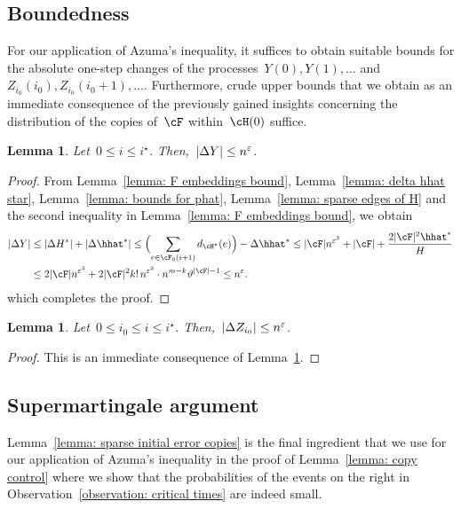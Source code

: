 \documentclass[11pt]{amsart}
\newcommand{\eps}{\varepsilon}
\DeclarePairedDelimiter{\paren}{\lparen}{\rparen}
\DeclarePairedDelimiter{\abs}{\lvert}{\rvert}
\renewcommand{\theta}{\vartheta}
\newtheorem{lemma}[algocf]{Lemma}
\theoremstyle{definition}
\numberwithin{equation}{section}
\begin{document}
	\subsection{Boundedness}\label{subsection: boundedness}
	For our application of Azuma's inequality, it suffices to obtain suitable bounds for the absolute one-step changes of the processes~$Y(0), Y(1),\ldots $ and~$Z_{i_0}(i_0),Z_{i_0}(i_0+1),\ldots$.
	Furthermore, crude upper bounds that we obtain as an immediate consequence of the previously gained insights concerning the distribution of the copies of~$\cF$ within~$\cH(0)$ suffice.
	
	\begin{lemma}\label{lemma: sparse absolute change copies not stopped}
		Let~$0 \leq i\leq i^\star$.
		Then,~$\abs{\Delta Y}\leq n^{\eps}$.
	\end{lemma}
	\begin{proof}
		From Lemma~\ref{lemma: F embeddings bound}, Lemma~\ref{lemma: delta hhat star}, Lemma~\ref{lemma: bounds for phat}, Lemma~\ref{lemma: sparse edges of H} and the second inequality in Lemma~\ref{lemma: F embeddings bound}, we obtain
		\begin{equation*}
			\begin{aligned}
				\abs{\Delta Y}
				&\leq \abs{\Delta H^*}+\abs{\Delta \hhat^*}
				\leq \paren[\Big]{\sum_{e\in \cF_0(i+1)}d_{\cH^*}(e)}-\Delta\hhat^*
				\leq \abs{\cF}n^{\eps^3}+\abs{\cF}+\frac{2\abs{\cF}^2\hhat^*}{H}\\
				&\leq 2\abs{\cF}n^{\eps^3}+2\abs{\cF}^2k!\,n^{\eps^2}\cdot n^{m-k}\theta^{\abs{\cF}-1}
				\leq n^\eps.
			\end{aligned}
		\end{equation*}
		which completes the proof.
	\end{proof}
	
	\begin{lemma}\label{lemma: sparse absolute change copies}
		Let~$0 \leq i_0\leq i\leq i^\star$.
		Then,~$\abs{\Delta Z_{i_0}}\leq n^{\eps}$.
	\end{lemma}
	\begin{proof}
		This is an immediate consequence of Lemma~\ref{lemma: sparse absolute change copies not stopped}.
	\end{proof}
	
	\subsection{Supermartingale argument}\label{subsection: supermartingale}
	Lemma~\ref{lemma: sparse initial error copies} is the final ingredient that we use for our application of Azuma's inequality in the proof of Lemma~\ref{lemma: copy control} where we show that the probabilities of the events on the right in Observation~\ref{observation: critical times} are indeed small.
	
\end{document}
